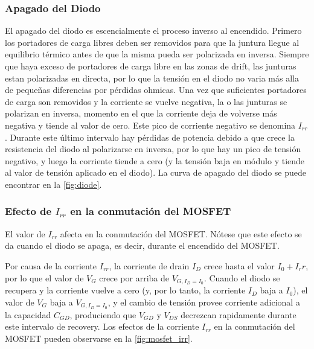 \documentclass[e4_tp1_main.tex]{subfiles}
\begin{document}
\subsubsection{Apagado del Diodo}
El apagado del diodo es escencialmente el proceso inverso al encendido. Primero los portadores de carga libres deben ser removidos para que la juntura llegue al equilibrio térmico antes de que la misma pueda ser polarizada en inversa. Siempre que haya exceso de portadores de carga libre en las zonas de drift, las junturas estan polarizadas en directa, por lo que la tensión en el diodo no varia más alla de pequeñas diferencias por pérdidas ohmicas. Una vez que suficientes portadores de carga son removidos y la corriente se vuelve negativa, la o las junturas se polarizan en inversa, momento en el que la corriente deja de volverse más negativa y tiende al valor de cero. Este pico de corriente negativo se denomina $I_{rr}$. Durante este último intervalo hay pérdidas de potencia debido a que crece la resistencia del diodo al polarizarse en inversa, por lo que hay un pico de tensión negativo, y luego la corriente tiende a cero (y la tensión baja en módulo y tiende al valor de tensión aplicado en el diodo). La curva de apagado del diodo se puede encontrar en la \autoref{fig:diode}.

\subsubsection{Efecto de $I_{rr}$ en la conmutación del MOSFET}

El valor de $I_{rr}$ afecta en la conmutación del MOSFET. Nótese que este efecto se da cuando el diodo se apaga, es decir, durante el encendido del MOSFET.

Por causa de la corriente $I_{rr}$, la corriente de drain $I_D$ crece hasta el valor $I_0+I_rr$, por lo que el valor de $V_{G}$ crece por arriba de $V_{G,I_D=I_0}$. Cuando el diodo se recupera y la corriente vuelve a cero (y, por lo tanto, la corriente $I_D$ baja a $I_0$), el valor de $V_G$ baja a $V_{G,I_D=I_0}$, y el cambio de tensión provee corriente adicional a la capacidad $C_{GD}$, produciendo que $V_{GD}$ y $V_{DS}$ decrezcan rapidamente durante este intervalo de recovery. Los efectos de la corriente $I_{rr}$ en la conmutación del MOSFET pueden observarse en la \autoref{fig:mosfet_irr}.
\end{document}
